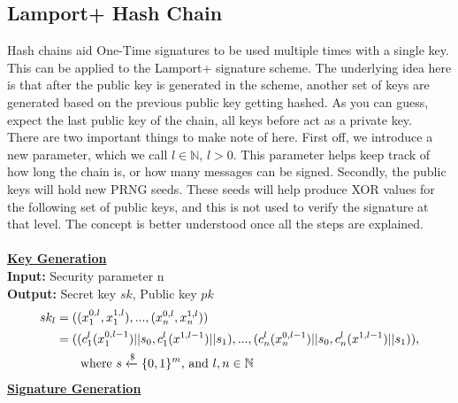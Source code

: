 \documentclass[]{scrartcl}
\makeatletter
\newcommand{\mathcenter}{\@fleqnfalse}
\makeatother
\begin{document}
\subsection*{Lamport+ Hash Chain}
Hash chains aid One-Time signatures to be used multiple times with a single key. This can be applied to the Lamport+ signature scheme. The underlying idea here is that after the public key is generated in the scheme, another set of keys are generated based on the previous public key getting hashed. As you can guess, expect the last public key of the chain, all keys before act as a private key.\\
There are two important things to make note of here. First off, we introduce a new parameter, which we call $l \in \mathbb{N}$, $l > 0$. This parameter helps keep track of how long the chain is, or how many messages can be signed. Secondly, the public keys will hold new PRNG seeds. These seeds will help produce XOR values for the following set of public keys, and this is not used to verify the signature at that level. The concept is better understood once all the steps are explained.\\ \\
\textbf{\underline{Key Generation}}\\
\textbf{Input:} Security parameter n \\
\textbf{Output:} Secret key $sk$, Public key $pk$
\mathcenter
\begin{equation}
\begin{split}
sk_l & = ((x_{1}^{0,l}, x_{1}^{1,l}),...,(x_{n}^{0,l}, x_{n}^{1,l}))\\
& = ((c^l_1(x^{0,l-1}_1)||s_0,c^l_1(x^{1,l-1})||s_1),...,(c^l_n(x^{0,l-1}_n)||s_0,c^l_n(x^{1,l-1})||s_1)), \\
& \hspace{0.7cm} \textrm{where } s\xleftarrow{\$} \{0,1\}^m \textrm{, and } l, n \in \mathbb{N}\\
\end{split}
\end{equation}
\textbf{\underline{Signature Generation}}\\
\end{document}
